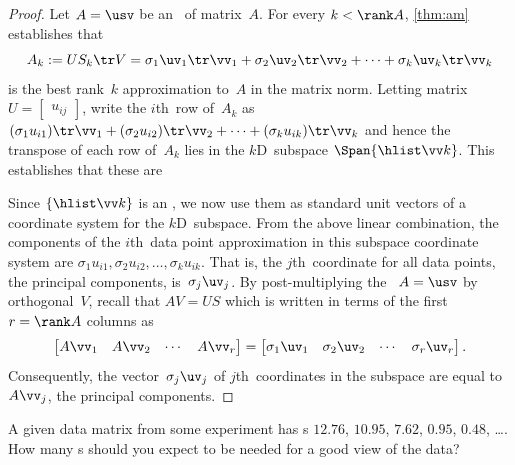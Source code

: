 \begin{proof} 
Let \(A=\usv\) be an \svd\ of matrix~\(A\).
For every \(k<\rank A\), \cref{thm:am} establishes that 
\begin{equation*}
A_k:=US_k\tr V 
=\sigma_1\uv_1\tr\vv_1 +\sigma_2\uv_2\tr\vv_2+\cdots +\sigma_k\uv_k\tr\vv_k
\end{equation*}
is the best rank~\(k\) approximation to~\(A\) in the matrix norm.
Letting matrix \(U=\begin{bmatrix} u_{ij} \end{bmatrix}\), write the \(i\)th~row of~\(A_k\) as
\((\sigma_1u_{i1})\tr\vv_1 +(\sigma_2u_{i2})\tr\vv_2+\cdots +(\sigma_ku_{ik})\tr\vv_k\) and hence the transpose of each row of~\(A_k\) lies in the \(k\)D~subspace \(\Span\{\hlist\vv k\}\).
This establishes that these are 

Since \(\{\hlist\vv k\}\) is an , we now use them as standard unit vectors of a coordinate system for the \(k\)D~subspace.
From the above linear combination, the components of the \(i\)th~data point approximation in this subspace coordinate system are \(\sigma_1u_{i1},\sigma_2u_{i2},\ldots,\sigma_ku_{ik}\).
That is, the \(j\)th~coordinate for all data points, the principal components, is~\(\sigma_j\uv_j\).
By post-multiplying the \svd\ \(A=\usv\) by orthogonal~\(V\), recall that \(AV=US\) which is written in terms of the first \(r=\rank A\) columns as
\begin{equation*}
\begin{bmatrix} A\vv_1&A\vv_2&\cdots&A\vv_r \end{bmatrix}
=\begin{bmatrix} \sigma_1\uv_1&\sigma_2\uv_2&\cdots&\sigma_r\uv_r\end{bmatrix} .
\end{equation*}
Consequently, the vector~\(\sigma_j\uv_j\) of \(j\)th~coordinates in the subspace are equal to~\(A\vv_j\), the principal components.
\end{proof}




\begin{activity}
A given data matrix from some experiment has s \(12.76\), \(10.95\), \(7.62\), \(0.95\), \(0.48\), \ldots.  
How many s should you expect to be needed for a good view of the data?
\end{activity}







